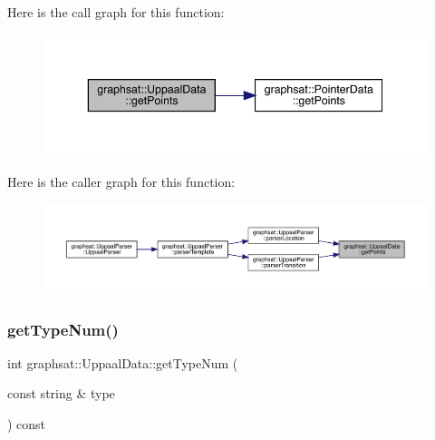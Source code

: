 Here is the call graph for this function\+:\nopagebreak
\begin{figure}[H]
\begin{center}
\leavevmode
\includegraphics[width=343pt]{classgraphsat_1_1_uppaal_data_ad421061c61d3f2012e261c28d44df2be_cgraph}
\end{center}
\end{figure}
Here is the caller graph for this function\+:\nopagebreak
\begin{figure}[H]
\begin{center}
\leavevmode
\includegraphics[width=350pt]{classgraphsat_1_1_uppaal_data_ad421061c61d3f2012e261c28d44df2be_icgraph}
\end{center}
\end{figure}
\mbox{\label{classgraphsat_1_1_uppaal_data_a1c420132ab6e3cfe21bd0fec604c8519}} 
\subsubsection{\texorpdfstring{getTypeNum()}{getTypeNum()}}
{\footnotesize\ttfamily int graphsat\+::\+Uppaal\+Data\+::get\+Type\+Num (\begin{DoxyParamCaption}\item[{const string \&}]{type }\end{DoxyParamCaption}) const\hspace{0.3cm}{\ttfamily [inline]}}

